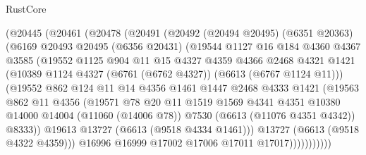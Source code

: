 \begin{lexlean}{RustCore}
\begin{coremodule}
            (@20445
              (@20461
                (@20478
                  (@20491
                    (@20492
                      (@20494 @20495)
                      (@6351 @20363)
                      (@6169
                        @20493
                        @20495
                        (@6356 @20431)
                        (@19544
                          @1127
                          @16
                          @184
                          @4360
                          @4367
                          @3585
                          (@19552
                            @1125
                            @904
                            @11
                            @15
                            @4327
                            @4359
                            @4366
                            @2468
                            @4321
                            @1421
                            (@10389 @1124 @4327 (@6761 (@6762 @4327)) (@6613 (@6767 @1124 @11)))
                            (@19552
                              @862
                              @124
                              @11
                              @14
                              @4356
                              @1461
                              @1447
                              @2468
                              @4333
                              @1421
                              (@19563
                                @862
                                @11
                                @4356
                                (@19571
                                  @78
                                  @20
                                  @11
                                  @1519
                                  @1569
                                  @4341
                                  @4351
                                  @10380
                                  @14000
                                  @14004
                                  (@11060 (@14006 @78))
                                  @7530
                                  (@6613 (@11076 @4351 @4342))
                                  @8333))
                              @19613
                              @13727
                              (@6613 (@9518 @4334 @1461)))
                            @13727
                            (@6613 (@9518 @4322 @4359)))
                          @16996
                          @16999
                          @17002
                          @17006
                          @17011
                          @17017)))))))))))

\end{coremodule}
\end{lexlean}

